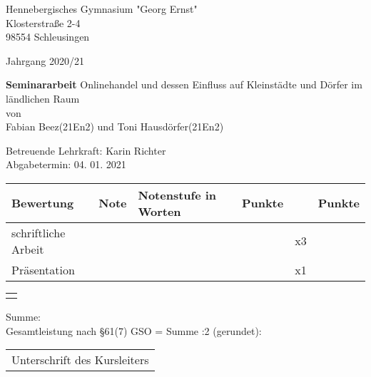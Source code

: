 \begin{titlepage}
    
    \raggedright
        Hennebergisches Gymnasium "Georg Ernst"\\
        Klosterstraße 2-4\\
        98554 Schleusingen
        
    \raggedleft\vspace*{-1.9cm}
        Jahrgang 2020/21
            \vfill\vfill\vfill\vfill\vfill\vfill

    \centering
        \LARGE\textbf{Seminararbeit} %
            \vfill
        \large Onlinehandel und dessen Einfluss auf Kleinstädte und Dörfer im ländlichen Raum\\[\baselineskip]
        von\\
        Fabian Beez(21En2) und Toni Hausdörfer(21En2)
            \vfill\vfill\vfill\vfill

    \raggedright
        Betreuende Lehrkraft: \hfill Karin Richter\\
        Abgabetermin: \hfill 04. 01. 2021\\[\baselineskip]
        \begin{tabular}[h]{|l|l|l|l|l|l|}
            \hline
            Bewertung & Note & Notenstufe in Worten & Punkte &  & Punkte \\
            \hline
            schriftliche Arbeit & & & & x3 & \\
            \hline
            Präsentation & & & & x1 & \\
            \hline
        \end{tabular}

    \raggedleft\vspace*{-0.05cm}
        \begin{tabular}[h]{|p{1.56cm}|}
            \hline
            \\
            \hline
            \\
            \hline
        \end{tabular}

    \raggedright\vspace*{-1.4cm}
        \hspace*{0.2cm}Summe: \hfill\\
        \hspace*{0.2cm}Gesamtleistung nach §61(7) GSO = Summe :2 (gerundet): \hfill\\[\baselineskip]
            \vfill\vfill\vfill
        
    \raggedleft
        \begin{tabular}{@{}l@{}}\hline
            Unterschrift des Kursleiters
        \end{tabular}
            \vfill\vfill
\end{titlepage}

\newpage
